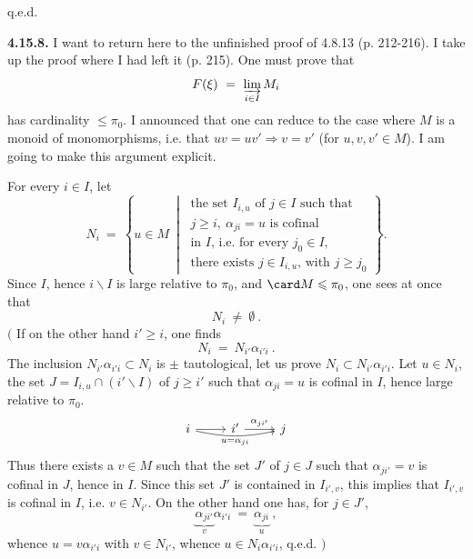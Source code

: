 \hfill q.e.d.


\textbf{4.15.8.} I want to return here to the unfinished proof of 4.8.13 (p. 212-216). I take up the proof where I had left it (p. 215). One must prove that
\[
F(\xi) \ = \ \varinjlim_{i\in I} M_i
\]
has cardinality $\leqslant \pi_0$. I announced that one can reduce to the case where $M$ is a monoid of monomorphisms, i.e. that $uv = uv' \Longrightarrow v = v'$ (for $u,v,v' \in M$). I am going to make this argument explicit.

For every $i\in I$, let
\[
N_i \ = \ \left\{ u \in M \ \middle| \ \begin{array}{l}
\text{the set } I_{i,u} \text{ of } j\in I \text{ such that}\\
j \geqslant i,\ \alpha_{ji} = u \text{ is cofinal}\\
\text{in } I\text{, i.e. for every } j_0\in I,\\
\text{there exists } j \in I_{i,u}\text{, with } j \geqslant j_0
\end{array} \right\} .
\tag*{(4.15.8.1)}
\]
Since $I$, hence $i\backslash I$ is large relative to $\pi_0$, and $\card M \leqslant \pi_0$, one sees at once that
\[
N_i \ \neq \ \emptyset \ .
\tag*{(4.15.8.2)}
\]
$\Big($ If on the other hand $i' \geqslant i$, one finds
\[
N_i \ = \ N_{i'}\alpha_{i'i} \ .
\tag*{(4.15.8.3)}
\]
The inclusion $N_{i'}\alpha_{i'i} \subset N_i$ is $\pm$ tautological, let us prove $N_i \subset N_{i'}\alpha_{i'i}$. Let $u \in N_i$, the set $J = I_{i,u} \cap (i'\backslash I)$ of $j \geqslant i'$ such that $\alpha_{ji} = u$ is cofinal in $I$, hence large relative to $\pi_0$.
\[
\begin{tikzcd}
i \arrow[r] \arrow[rr, bend right=12, "u = \alpha_{ji}"'] & i' \arrow[r, "\alpha_{ji'}"] & j
\end{tikzcd}
\]
Thus there exists a $v \in M$ such that the set $J'$ of $j\in J$ such that $\alpha_{ji'} = v$
is cofinal in $J$, hence in $I$. Since this set $J'$ is contained in $I_{i',v}$, this implies that $I_{i',v}$ is cofinal in $I$, i.e. $v \in N_{i'}$. On the other hand one has, for $j \in J'$,
\[
\underbrace{\alpha_{ji'}}_{v}\alpha_{i'i} \ = \ \underbrace{\alpha_{ji}}_{u} \ ,
\]
whence $u = v\alpha_{i'i}$ with $v\in N_{i'}$, whence $u \in N_i\alpha_{i'i}$, q.e.d. $\Big)$ %

